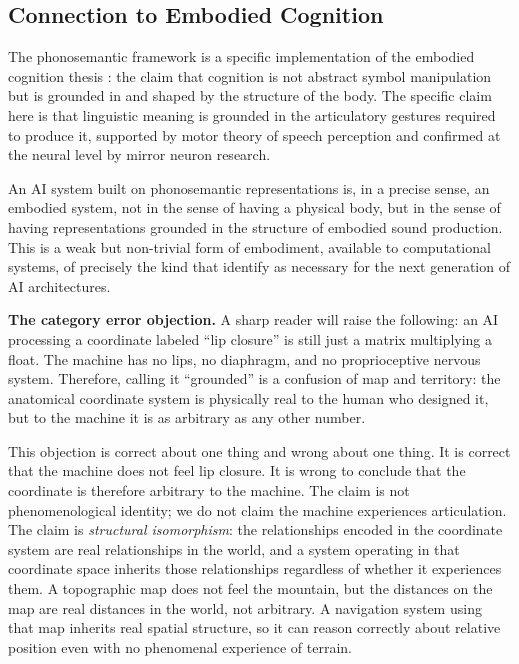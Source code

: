 \documentclass[12pt]{article}
\begin{document}
\subsection{Connection to Embodied Cognition}

The phonosemantic framework is a specific implementation of the embodied cognition thesis \citep{lakoff1999, varela1991}: the claim that cognition is not abstract symbol manipulation but is grounded in and shaped by the structure of the body. The specific claim here is that linguistic meaning is grounded in the articulatory gestures required to produce it, supported by motor theory of speech perception and confirmed at the neural level by mirror neuron research.

An AI system built on phonosemantic representations is, in a precise sense, an embodied system, not in the sense of having a physical body, but in the sense of having representations grounded in the structure of embodied sound production. This is a weak but non-trivial form of embodiment, available to computational systems, of precisely the kind that \citet{kadambi2025} identify as necessary for the next generation of AI architectures.

\textbf{The category error objection.} A sharp reader will raise the following: an AI processing a coordinate labeled ``lip closure'' is still just a matrix multiplying a float. The machine has no lips, no diaphragm, and no proprioceptive nervous system. Therefore, calling it ``grounded'' is a confusion of map and territory: the anatomical coordinate system is physically real to the human who designed it, but to the machine it is as arbitrary as any other number.

This objection is correct about one thing and wrong about one thing. It is correct that the machine does not feel lip closure. It is wrong to conclude that the coordinate is therefore arbitrary to the machine. The claim is not phenomenological identity; we do not claim the machine experiences articulation. The claim is \textit{structural isomorphism}: the relationships encoded in the coordinate system are real relationships in the world, and a system operating in that coordinate space inherits those relationships regardless of whether it experiences them. A topographic map does not feel the mountain, but the distances on the map are real distances in the world, not arbitrary. A navigation system using that map inherits real spatial structure, so it can reason correctly about relative position even with no phenomenal experience of terrain.
\end{document}
